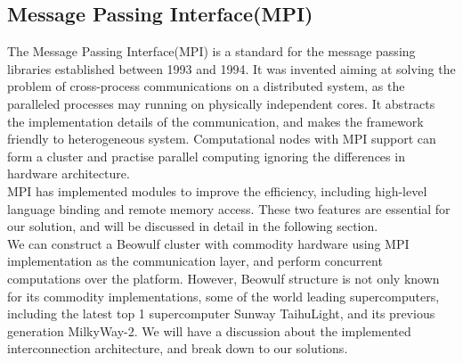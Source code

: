 \documentclass[11pt,openright,a4paper]{report}
\begin{document}
\subsection{Message Passing Interface(MPI)}
The Message Passing Interface(MPI) is a standard for the message passing libraries established between 1993 and 1994\cite{geist1996mpi}. It was invented aiming at solving the problem of cross-process communications on a distributed system, as the paralleled processes may running on physically independent cores. It abstracts the implementation details of the communication, and makes the framework friendly to heterogeneous system. Computational nodes with MPI support can form a cluster and practise parallel computing ignoring the differences in hardware architecture.\\
MPI has implemented modules to improve the efficiency, including high-level language binding and remote memory access\cite{gropp1996high}. These two features are essential for our solution, and will be discussed in detail in the following section.\\
We can construct a Beowulf cluster with commodity hardware using MPI implementation as the communication layer, and perform concurrent computations over the platform. However, Beowulf structure is not only known for its commodity implementations, some of the world leading supercomputers, including the latest top 1 supercomputer Sunway TaihuLight\cite{fu2016sunway}, and its previous generation MilkyWay-2\cite{liao2014milkyway}. We will have a discussion about the implemented interconnection architecture, and break down to our solutions.\\
\end{document}
